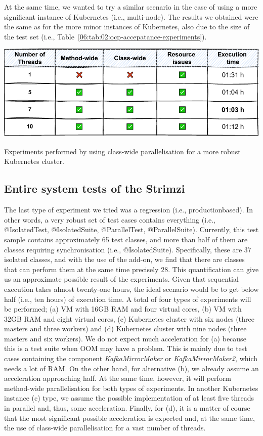 At the same time, we wanted to try a similar scenario in the case of using a more significant instance of Kubernetes (i.e., multi-node).
The results we obtained were the same as for the more minor instances of Kubernetes, also due to the size of the test set
(i.e., Table~\ref{06:tab:02:ocp-accepatance-experiments}).
\begin{table}[ht!]
    \centering
    \includegraphics[scale=0.8]{obrazky-figures/08-experiments/acceptance/06-exp-ocp-accpetance-second}
    \caption{Experiments performed by using class-wide parallelisation for a more robust Kubernetes cluster.}
    \label{06:tab:02:ocp-accepatance-experiments}
\end{table}

\subsection{Entire system tests of the Strimzi}
\label{06:subsec:regression-experiments}
The last type of experiment we tried was a regression (i.e., production\-based).
In other words, a very robust set of test cases contains everything (i.e., @IsolatedTest, @IsolatedSuite,
@ParallelTest, @ParallelSuite).
Currently, this test sample contains approximately 65 test classes, and more than half of them are classes
requiring synchronisation (i.e., @IsolatedSuite).
Specifically, these are 37 isolated classes, and with the use of the add-on, we find that there are classes that
can perform them at the same time precisely 28.
This quantification can give us an approximate possible result of the experiments.
Given that sequential execution takes almost twenty-one hours, the ideal scenario would be to get below half
(i.e., ten hours) of execution time.
A total of four types of experiments will be performed; (a) VM with 16GB RAM and four virtual cores,
(b) VM with 32GB RAM and eight virtual cores, (c) Kubernetes cluster with six nodes (three masters and three workers)
and (d) Kubernetes cluster with nine nodes (three masters and six workers).
We do not expect much acceleration for (a) because this is a test suite when OOM may have a problem.
This is mainly due to test cases containing the component \emph{KafkaMirrorMaker} or \emph{KafkaMirrorMaker2}, which
needs a lot of RAM. On the other hand, for alternative (b), we already assume an acceleration approaching half.
At the same time, however, it will perform method-wide parallelisation for both types of experiments.
In another Kubernetes instance (c) type, we assume the possible implementation of at least five threads
in parallel and, thus, some acceleration.
Finally, for (d), it is a matter of course that the most significant possible acceleration is expected and,
at the same time, the use of class-wide parallelisation for a vast number of threads.

